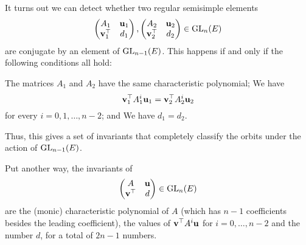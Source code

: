 \begin{remark}
  It turns out we can detect whether two regular semisimple elements
  \[
    \begin{pmatrix} A_1 & \mathbf u_1 \\ \mathbf v_1^\top & d_1 \end{pmatrix},
    \begin{pmatrix} A_2 & \mathbf u_2 \\ \mathbf v_2^\top & d_2 \end{pmatrix}
    \in \operatorname{GL}_{n}(E)
  \]
  are conjugate by an element of $\operatorname{GL}_{n-1}(E)$.
  This happens if and only if the following conditions all hold:
  \begin{itemize}
    \ii The matrices $A_1$ and $A_2$ have the same characteristic polynomial;
    \ii We have \[ \mathbf v_1^\top A_1^i \mathbf u_1 = \mathbf v_2^\top A_2^i \mathbf u_2 \]
    for every $i = 0, 1, \dots, n-2$; and
    \ii We have $d_1 = d_2$.
  \end{itemize}
  Thus, this gives a set of invariants that completely classify the orbits
  under the action of $\operatorname{GL}_{n-1}(E)$.

  Put another way, the invariants of
  \[ \begin{pmatrix} A & \mathbf u \\ \mathbf v^\top & d \end{pmatrix} \in \operatorname{GL}_n(E) \]
  are the (monic) characteristic polynomial of $A$
  (which has $n-1$ coefficients besides the leading coefficient),
  the values of $\mathbf v^\top A^i \mathbf u$ for $i = 0, \dots, n-2$
  and the number $d$, for a total of $2n-1$ numbers.
  \label{rem:invariants}
\end{remark}


